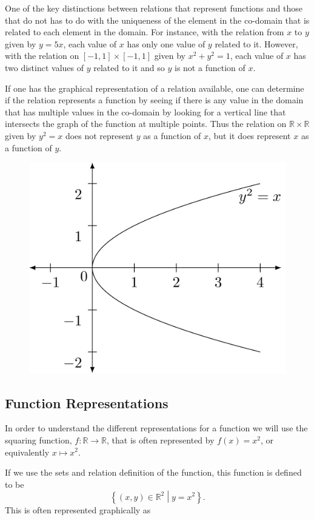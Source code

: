 \documentclass[
]{book}
\theoremstyle{definition}
\theoremstyle{definition}
\theoremstyle{definition}
\theoremstyle{definition}
\theoremstyle{remark}
\begin{document}
One of the key distinctions between relations that represent functions and those that do not has to do with the uniqueness of the element in the co-domain that is related to each element in the domain. For instance, with the relation from \(x\) to \(y\) given by \(y=5x\), each value of \(x\) has only one value of \(y\) related to it. However, with the relation on \([-1,1]\times [-1,1]\) given by \(x^2+y^2=1\), each value of \(x\) has two distinct values of \(y\) related to it and so \(y\) is not a function of \(x\).

If one has the graphical representation of a relation available, one can determine if the relation represents a function by seeing if there is any value in the domain that has multiple values in the co-domain by looking for a vertical line that intersects the graph of the function at multiple points. Thus the relation on \(\mathbb{R}\times \mathbb{R}\) given by \(y^2=x\) does not represent \(y\) as a function of \(x\), but it does represent \(x\) as a function of \(y\).

\begin{figure}

{\centering \includegraphics[width=0.4\linewidth]{tikz/graph-ysquared-equals-x} 

}

\end{figure}

\hypertarget{function-representations}{%
\subsection{Function Representations}\label{function-representations}}

In order to understand the different representations for a function we will use the squaring function, \(f:\mathbb{R}\rightarrow \mathbb{R}\), that is often represented by \(f(x)=x^2\), or equivalently \(x\mapsto x^2\).

If we use the sets and relation definition of the function, this function is defined to be
\[\left\{ (x,y)\in \mathbb{R}^2 \middle \vert  y=x^2\right\}.\] This is often represented graphically as
\end{document}
